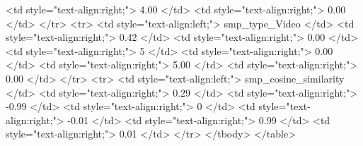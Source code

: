   <td style="text-align:right;"> 4.00 </td>
   <td style="text-align:right;"> 0.00 </td>
  </tr>
  <tr>
   <td style="text-align:left;"> smp_type_Video </td>
   <td style="text-align:right;"> 0.42 </td>
   <td style="text-align:right;"> 0.00 </td>
   <td style="text-align:right;"> 5 </td>
   <td style="text-align:right;"> 0.00 </td>
   <td style="text-align:right;"> 5.00 </td>
   <td style="text-align:right;"> 0.00 </td>
  </tr>
  <tr>
   <td style="text-align:left;"> smp_cosine_similarity </td>
   <td style="text-align:right;"> 0.29 </td>
   <td style="text-align:right;"> -0.99 </td>
   <td style="text-align:right;"> 0 </td>
   <td style="text-align:right;"> -0.01 </td>
   <td style="text-align:right;"> 0.99 </td>
   <td style="text-align:right;"> 0.01 </td>
  </tr>
</tbody>
</table>
